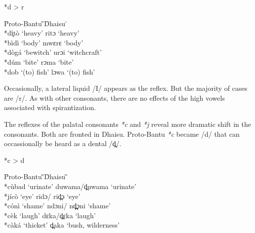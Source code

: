 \documentclass[output=paper,colorlinks,citecolor=brown]{langscibook}
\begin{document}
\ea%
    \label{ex:ngonyani:8}
    *d > r\\
    \begin{tabbing} 
        \= Proto-Bantu \quad\= \quad\= \quad\= \quad\= \quad\= \quad\= \quad\= Dhaisu \quad\=  \quad\= \\
        \> *dì̧tò
        \> ‘heavy’
        \> \> \>  \> \> \> ritɔ
        \> ‘heavy’\\
        
        \> *bìdì
        \> ‘body’
        \> \> \>  \> \> \> mwɛrɛ
        \> ‘body’\\
        
        \> *dògá
        \> ‘bewitch’
        \> \> \>  \> \> \> urɔi
        \> ‘witchcraft’\\
        
        \> *dúm
        \> ‘bite’
        \> \> \>  \> \> \> rɔma
        \> ‘bite’\\
        
        \> *dob
        \> ‘(to) fish’
        \> \> \>  \> \> \> lɔwa
        \> ‘(to) fish’
   \end{tabbing}
\z

Occasionally, a lateral liquid /I/ appears as the reflex. But the majority of cases are /r/. As with other consonants, there are no effects of the high vowels associated with spirantization.

The reflexes of the palatal consonants \textit{*c} and \textit{*j} reveal more dramatic shift in the consonants. Both are fronted in Dhaisu. Proto-Bantu \textit{*c} became /d/ that can occassionally be heard as a dental /d̪/.

\ea%
    \label{ex:ngonyani:9}
    *c > d\\
    \begin{tabbing} 
        \= Proto-Bantu \quad\= \quad\= \quad\= \quad\= \quad\= \quad\= \quad\= Dhaisu \quad\=  \quad\= \quad\= \quad\= \quad\=\\
     
        \> *cùbad
        \> ‘urinate’
        \> \> \>  \> \> \> duwama/d̪uwama
        \> \> \> \> \>  ‘urinate’\\
        
        \> *jícò
        \> ‘eye’
        \> \> \>  \> \> \> ridɔ/ rid̪ɔ
        \> \> \> \> \> ‘eye’\\
        
        \> *cónì
        \> ‘shame’
        \> \> \>  \> \> \> ndɔni/ nd̪̪ɔni
        \> \> \> \> \> ‘shame’\\
        
        \> *cèk
        \> ‘laugh’
        \> \> \>  \> \> \> dɛka/d̪ɛka
        \> \> \> \> \> ‘laugh’\\
        
        \> *càká
        \> ‘thicket’
        \> \> \>  \> \> \> d̪aka
        \> \> \> \> \> ‘bush, wilderness’
    \end{tabbing}
\z
\end{document}
